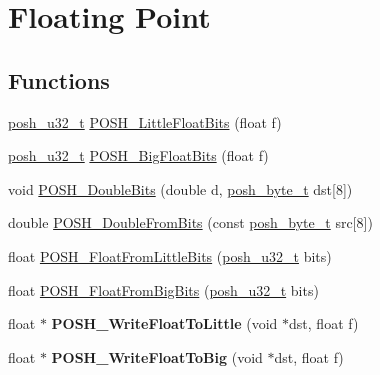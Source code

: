 \hypertarget{group__FloatingPoint}{}\section{Floating Point}
\label{group__FloatingPoint}
\subsection*{Functions}
\begin{DoxyCompactItemize}
\item 
\hyperlink{group__PoshTypes_ga020bf929bf912667f0fa4312d816c2e0}{posh\+\_\+u32\+\_\+t} \hyperlink{group__FloatingPoint_ga384e7a2791d023062bcd0fb0c56d33cf}{P\+O\+S\+H\+\_\+\+Little\+Float\+Bits} (float f)
\item 
\hyperlink{group__PoshTypes_ga020bf929bf912667f0fa4312d816c2e0}{posh\+\_\+u32\+\_\+t} \hyperlink{group__FloatingPoint_ga1eca8e7b3d6e9f4953765d2bf33b0426}{P\+O\+S\+H\+\_\+\+Big\+Float\+Bits} (float f)
\item 
void \hyperlink{group__FloatingPoint_gaf99025b522ae347afdcffae40dcacb8e}{P\+O\+S\+H\+\_\+\+Double\+Bits} (double d, \hyperlink{group__PoshTypes_ga3d52997a5402758b6d8cea03bb931f05}{posh\+\_\+byte\+\_\+t} dst\mbox{[}8\mbox{]})
\item 
double \hyperlink{group__FloatingPoint_ga87e8b2d4f305581c96b1edb2345a5dbe}{P\+O\+S\+H\+\_\+\+Double\+From\+Bits} (const \hyperlink{group__PoshTypes_ga3d52997a5402758b6d8cea03bb931f05}{posh\+\_\+byte\+\_\+t} src\mbox{[}8\mbox{]})
\item 
float \hyperlink{group__FloatingPoint_gacefa578ca480f04ec24ce85f7b63634a}{P\+O\+S\+H\+\_\+\+Float\+From\+Little\+Bits} (\hyperlink{group__PoshTypes_ga020bf929bf912667f0fa4312d816c2e0}{posh\+\_\+u32\+\_\+t} bits)
\item 
float \hyperlink{group__FloatingPoint_ga1556934ccc724bdf546127f4a2945b31}{P\+O\+S\+H\+\_\+\+Float\+From\+Big\+Bits} (\hyperlink{group__PoshTypes_ga020bf929bf912667f0fa4312d816c2e0}{posh\+\_\+u32\+\_\+t} bits)
\item 
float $\ast$ {\bfseries P\+O\+S\+H\+\_\+\+Write\+Float\+To\+Little} (void $\ast$dst, float f)\hypertarget{group__FloatingPoint_ga481b51031dcba11606811c0ce56f91f8}{}\label{group__FloatingPoint_ga481b51031dcba11606811c0ce56f91f8}

\item 
float $\ast$ {\bfseries P\+O\+S\+H\+\_\+\+Write\+Float\+To\+Big} (void $\ast$dst, float f)\hypertarget{group__FloatingPoint_gae04425ce71a389be411b32d643753412}{}\label{group__FloatingPoint_gae04425ce71a389be411b32d643753412}


\end{DoxyCompactItemize}
